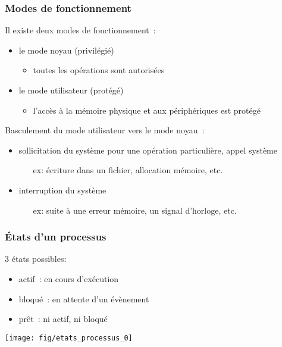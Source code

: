 \begin{frame}
\frametitle{Modes de fonctionnement}
Il existe deux modes de fonctionnement~:
\begin{itemize}
\item le \alert{mode noyau} (privilégié)
  \begin{itemize}
  \item toutes les opérations sont autorisées 
  \end{itemize}
\item le \alert{mode utilisateur} (protégé)
  \begin{itemize}
  \item l'accès à la mémoire physique et aux périphériques est protégé
  \end{itemize}
\end{itemize}
\vspace{0.5cm}

Basculement du mode utilisateur vers le mode noyau~:
\begin{itemize}
\item sollicitation du système pour une opération particulière, \alert{appel système}
  \begin{itemize}
  \item[\small{ex:}] écriture dans un fichier, allocation mémoire, etc.
  \end{itemize}
\item interruption du système
  \begin{itemize}
  \item[\small{ex:}] suite à une erreur mémoire, un signal d'horloge, etc.
  \end{itemize}
\end{itemize}
\end{frame} 




\begin{frame}
\frametitle{États d'un processus}
3 états possibles: 
\begin{itemize}
\item \alert{actif}~: en cours d'exécution
\item \alert{bloqué}~: en attente d'un évènement 
\item \alert{prêt}~: ni actif, ni bloqué
\end{itemize}
\begin{minipage}[t]{\linewidth}
  \center
  \texttt{[image: fig/etats\_processus\_0]}
\end{minipage}
\end{frame}


